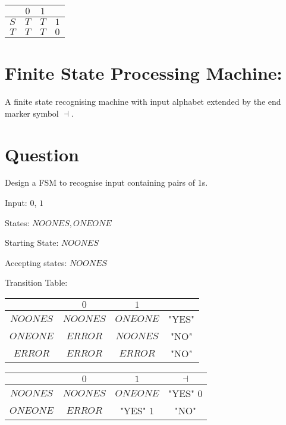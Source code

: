 \documentclass[a4paper,12pt]{article}
\begin{document}
\begin{tabular}{|c|c|c|c|}

\hline
		 	& $0$ 	& $1$ 	& 		\\
\hline
$S$		& $T$		& $T$		& $1$	\\
\hline
$T$		& $T$		& $T$		& $0$	\\
\hline

\end{tabular}


\section{Finite State Processing Machine:}

A finite state recognising machine with input alphabet extended by the
end marker symbol $\dashv$.


\section{Question}

Design a FSM to recognise input containing pairs of $1$s.


Input: $0$, $1$

States: ${NOONES, ONEONE}$

Starting State: ${NOONES}$

Accepting states: ${NOONES}$

Transition Table:

\begin{tabular}{|c|c|c|c|}
\hline
		 	& $0$ 			& $1$ 			& 			\\
\hline
$NOONES$	& $NOONES$		& $ONEONE$		& "YES"	\\
\hline
$ONEONE$	& $ERROR$		& $NOONES$		& "NO"	\\
\hline
$ERROR$	& $ERROR$		& $ERROR$		& "NO"	\\
\hline
\end{tabular}


\begin{tabular}{|c|c|c|c|}
\hline
		 	& $0$ 			& $1$ 			& $\dashv$		\\
\hline
$NOONES$	& $NOONES$		& $ONEONE$		& "YES" $0$		\\
\hline
$ONEONE$	& $ERROR$		& "YES" $1$		& "NO"			\\
\hline
\end{tabular}
\end{document}
